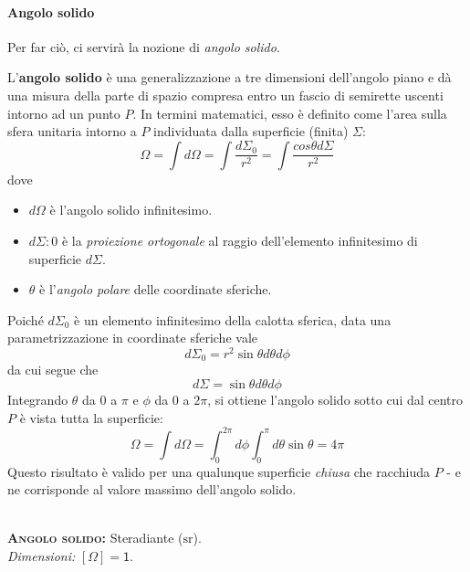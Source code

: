 \paragraph{Angolo solido}
Per far ciò, ci servirà la nozione di \textit{angolo solido}.
\begin{define}
	L'\textbf{angolo solido} è una generalizzazione a tre dimensioni dell'angolo piano e dà una misura della parte di spazio compresa entro un fascio di semirette uscenti intorno ad un punto $P$. In termini matematici, esso è definito come l'area sulla sfera unitaria intorno a $P$ individuata dalla superficie (finita) $\Sigma$:
	\begin{equation}
		\Omega=\int d\Omega =\int \frac{d\Sigma_0}{r^2}=\int\frac{cos\theta d\Sigma}{r^2}
	\end{equation}
	dove
	\begin{itemize}
		\item $d\Omega$ è l'angolo solido infinitesimo.
		\item $d\Sigma:0$ è la \textit{proiezione ortogonale} al raggio dell'elemento infinitesimo di superficie $d\Sigma$.
		\item $\theta$ è l'\textit{angolo polare} delle coordinate sferiche.
	\end{itemize}
\end{define}
Poiché $d\Sigma_0$ è un elemento infinitesimo della calotta sferica, data una parametrizzazione in coordinate sferiche vale
\begin{equation*}
	d\Sigma_0=r^2\sin\theta d\theta d\phi
\end{equation*}
da cui segue che
\begin{equation}
	d\Sigma=\sin\theta d\theta d\phi
\end{equation}
Integrando $\theta$ da $0$ a $\pi$ e $\phi$ da $0$ a $2\pi$, si ottiene l'angolo solido sotto cui dal centro $P$ è vista tutta la superficie:
\begin{equation}
	\Omega=\int d\Omega=\int_0^{2\pi}d\phi\int_0^\pi d\theta\sin\theta=4\pi
\end{equation}
Questo risultato è valido per una qualunque superficie \textit{chiusa} che racchiuda $P$ - e ne corrisponde al valore massimo dell'angolo solido.\\
\begin{units}~\\
	\textbf{\textsc{Angolo solido:}} Steradiante  ($\unit{\steradian}$).\\
	\textit{Dimensioni:} $[\Omega]=\mathsf{1}$.
\end{units}
